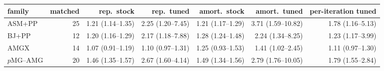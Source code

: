\begin{tabular}{lrrrrrr}
\toprule
family & matched & rep.\ stock & rep.\ tuned & amort.\ stock & amort.\ tuned & per-iteration tuned\\
\midrule
ASM+PP & 25 & 1.21 (1.14--1.35) & 2.25 (1.20--7.45) & 1.21 (1.17--1.29) & 3.71 (1.59--10.82) & 1.78 (1.16--5.13)\\
BJ+PP & 12 & 1.20 (1.16--1.29) & 2.17 (1.18--7.88) & 1.28 (1.24--1.48) & 2.24 (1.34--8.25) & 1.23 (1.17--3.99)\\
AMGX & 14 & 1.07 (0.91--1.19) & 1.10 (0.97--1.31) & 1.25 (0.93--1.53) & 1.41 (1.02--2.45) & 1.11 (0.97--1.30)\\
$p$MG--AMG & 20 & 1.46 (1.35--1.57) & 2.67 (1.60--4.14) & 1.49 (1.34--1.56) & 2.79 (1.76--10.05) & 1.79 (1.55--2.84)\\
\bottomrule
\end{tabular}
